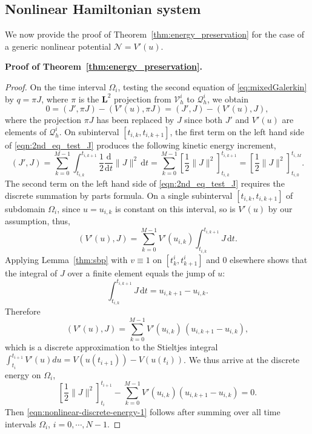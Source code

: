 \documentclass[12pt]{article}
\begin{document}
\subsection{Nonlinear Hamiltonian system}

We now provide the proof of Theorem~\ref{thm:energy_preservation} for the case of a generic nonlinear potential $\mathcal{N} = V'(u)$.

\noindent\textbf{Proof of Theorem~\ref{thm:energy_preservation}.}
\begin{proof}
	On the time interval $\Omega_i$, testing the second equation of \ref{eq:mixedGalerkin} by $q = \pi J$, where $\pi$ is the $\mathbf{L}^2$ projection from $\mathcal{V}_h^i$ to $\mathcal{Q}_h^i$, we obtain
\begin{equation} \label{eqn:2nd_eq_test_J}
    0 = (J',\pi J) - (V'(u), \pi J)  = (J', J) - (V'(u), J),
\end{equation}
where the projection $\pi J$ has been replaced by $J$ since both $J'$ and $V'(u)$ are elements of $\mathcal{Q}_h^i$.  On subinterval $[t_{i,k}, t_{i, k+1}]$,  the first term on the left hand side of \eqref{eqn:2nd_eq_test_J} produces the following kinetic energy increment,
\[
(J',J) = \sum_{k=0}^{M-1} \int_{t_{i,k}}^{t_{i,k+1}}\frac12 \frac{\mathrm{d}}{\mathrm{d}t} \|J\|^2 \,\mathrm{d}t =  \sum_{k=0}^{M-1}  \left[\frac{1}{2} \| J \|^2 \right]_{t_{i,k}}^{t_{i,k+1}} = \left[ \frac{1}{2} \|J\|^2 \right]_{t_{i,0}}^{t_{i,M}}.
\]
The second term on the left hand side of \eqref{eqn:2nd_eq_test_J} requires the discrete summation by parts formula.  On a single subinterval $[t_{i,k},t_{i,k+1}]$ of subdomain $\Omega_i$, since $u = u_{i,k}$ is constant on this interval, so is $V'(u)$ by our assumption, thus,
\begin{equation}
    (V'(u), J) 
    = \sum_{k=0}^{M-1}
      V'(u_{i,k}) \int_{t_{i,k}}^{t_{i,k+1}} J \,\mathrm{d}t.
\end{equation}
Applying Lemma~\ref{thm:sbp} with $v\equiv 1$ on $[t_{k}^i,t_{k+1}^i]$ and $0$ elsewhere
shows that the integral of $J$ over a finite element equals the jump
of $u$:
\[
\int_{t_{i,k}}^{t_{i,k+1}} J\,\mathrm{d}t = u_{i,k+1}-u_{i,k}.
\]
Therefore
\begin{equation}
    (V'(u), J)
    = \sum_{k=0}^{M-1} V'(u_{i,k})\,(u_{i,k+1}-u_{i,k}),
\end{equation}
which is a discrete approximation to the Stieltjes integral $\int_{t_i}^{t_{i+1}} V'(u) du = V(u(t_{i+1})) - V(u(t_{i}))$.   We thus arrive at the discrete energy on $\Omega_i$, 
\begin{equation*}
    \left[ \frac12 \|J\|^2 \right]^{t_{i+1}}_{t_{i}} - \sum_{k=0}^{M-1} V'(u_{i,k}) \left( u_{i,k+1} - u_{i,k}\right) = 0.
\end{equation*}
Then \eqref{eqn:nonlinear-discrete-energy-1} follows after summing over all time intervals $\Omega_i$, $i=0, \cdots, N-1$.
\end{proof}
\end{document}
